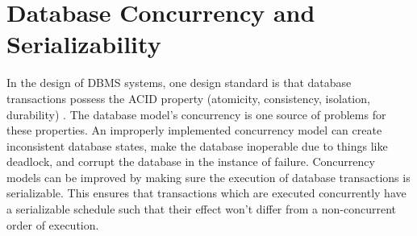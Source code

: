 \section{Database Concurrency and Serializability}
In the design of DBMS systems, one design standard is that database transactions possess the ACID property (atomicity, consistency, isolation, durability) \cite{textbook}. The database model’s concurrency is one source of problems for these properties. An improperly implemented concurrency model can create inconsistent database states, make the database inoperable due to things like deadlock, and corrupt the database in the instance of failure. Concurrency models can be improved by making sure the execution of database transactions is serializable. This ensures that transactions which are executed concurrently have a serializable schedule such that their effect won’t differ from a non-concurrent order of execution.


